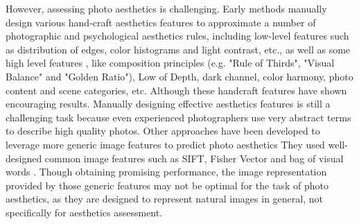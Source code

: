 \documentclass[10pt,twocolumn,letterpaper]{article}
\begin{document}
However, assessing photo aesthetics is challenging. 
Early methods \cite{Datta:2006:ECCV} \cite{Ke:2006:CVPR} manually design various hand-craft aesthetics features to approximate a number of photographic and psychological aesthetics rules, including low-level features \cite{Luo:2008:ECCV} \cite{Bhattacharya:2010:ACMMM} such as distribution of edges, color histograms and light contrast, etc., as well as some high level features \cite{Tang:2013:TMM} \cite{Sagnik:2011:CVPR} \cite{Su:2011:ACMMM} \cite{Cohen-Or:2006:SIGGRAPH}, like composition principles (e.g. "Rule of Thirds", "Visual Balance" and "Golden Ratio"),  Low of Depth, dark channel, color harmony, photo content and scene categories, etc.
Although these handcraft features have shown encouraging 
results. Manually designing effective aesthetics
features is still a challenging task because even experienced photographers use very abstract terms to describe high quality photos.
Other approaches have been developed to leverage more 
generic image features to predict photo aesthetics 
They used well-designed common image features such as SIFT, Fisher Vector 
\cite{Marchesotti:2011:ICCV} \cite{Perronnin:2010:ECCV}  
and bag of visual words \cite{Su:2011:ACMMM}. Though obtaining
promising performance, the image representation provided
by those generic features may not be optimal for the 
task of photo aesthetics, as they are designed to represent natural images in
general, not specifically for aesthetics assessment.
\end{document}
